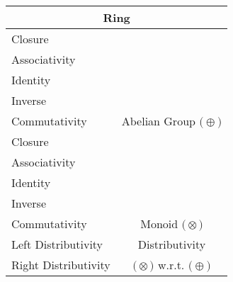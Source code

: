 \documentclass[a4paper,12pt]{scrartcl}    %
\newcommand{\OpA}{\otimes}
\newcommand{\OpB}{\oplus}
\begin{document}
\begin{minipage}[c]{0,5\textwidth}
\vspace{0.6cm}
\begin{tabular}{|l|c|} %
  \hline
  \multicolumn{2}{c}{\cellcolor{green!25}Ring} \\
  \hline
    \cellcolor{blue!25} Closure& \cellcolor{yellow!25}  \\
    \cellcolor{blue!25} Associativity& \cellcolor{yellow!25}  \\
    \cellcolor{blue!25} Identity& \cellcolor{yellow!25} \\
    \cellcolor{blue!25} Inverse& \cellcolor{yellow!25} \\
    \cellcolor{blue!25} Commutativity& \multirow{-5}{*}{\tiny\cellcolor{yellow!25}Abelian Group $\big(\OpB\big)$} \\
   \hline
    \cellcolor{blue!25} Closure& \cellcolor{yellow!25}  \\
    \cellcolor{blue!25} Associativity& \cellcolor{yellow!25}  \\
    \cellcolor{blue!25} Identity& \cellcolor{yellow!25} \\
    \cellcolor{red!25} Inverse& \cellcolor{yellow!25} \\
    \cellcolor{red!25} Commutativity& \multirow{-5}{*}{\tiny\cellcolor{yellow!25}Monoid $\big(\OpA\big)$} \\
  \hline    
	\cellcolor{blue!25} Left Distributivity&  \tiny\cellcolor{yellow!25}Distributivity\\
    \cellcolor{blue!25} Right Distributivity & \tiny\cellcolor{yellow!25} $\big(\OpA\big)$ w.r.t. $\big(\OpB\big)$  \\
   \hline
\end{tabular}


\end{minipage}
\end{document}
